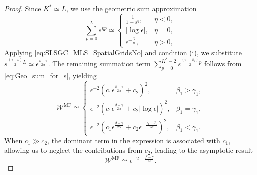\begin{proof}
Since $K^*\simeq L$, we use the geometric sum approximation
%
\begin{equation}
\label{eq:Geo_sum_for_s}
\sum_{p=0}^L s^{\eta p}\simeq\left\{\begin{array}{ll}
\frac{1}{1-s^{\eta}}, & \eta<0,\\
|\log \epsilon|, & \eta = 0,\\
\epsilon^{-\frac{\eta}{\alpha}}, & \eta>0,
\end{array}
\right.
\end{equation}
%
Applying \eqref{eq:SLSGC_MLS_SpatialGridsNo} and condition (i), we substitute $s^{\frac{(\gamma-\beta)}{2}L}\simeq \epsilon^{\frac{\beta-\gamma}{2\alpha}}$. The remaining summation term $\sum_{p=0}^{K^*-2}s^{\frac{(\gamma_1-\beta_1)}{2}p}$ follows from \eqref{eq:Geo_sum_for_s}, yielding
%
\[
\mathcal{W}^\text{MF} \simeq \left\{\begin{array}{ll}
\epsilon^{-2}\left(c_1\epsilon^{\frac{\beta-\gamma}{2\alpha}}+c_2\right)^2, & \beta_1>\gamma_1,\\
\epsilon^{-2}\left(c_1\epsilon^{\frac{\beta-\gamma}{2\alpha}}+c_2|\log\epsilon|\right)^2, & \beta_1=\gamma_1,\\
\epsilon^{-2}\left(c_1\epsilon^{\frac{\beta-\gamma}{2\alpha}}+c_2\epsilon^{-\frac{\gamma_1-\beta_1}{2\alpha}}\right)^2, & \beta_1<\gamma_1.
\end{array}
\right.
\]
%
When $c_1\gg c_2$, the dominant term in the expression is associated with $c_1$, allowing us to neglect the contributions from $c_2$, leading to the asymptotic result
\[
\mathcal{W}^\text{MF} \simeq \epsilon^{-2+\frac{\beta-\gamma}{\alpha}}.
\]
\end{proof}


